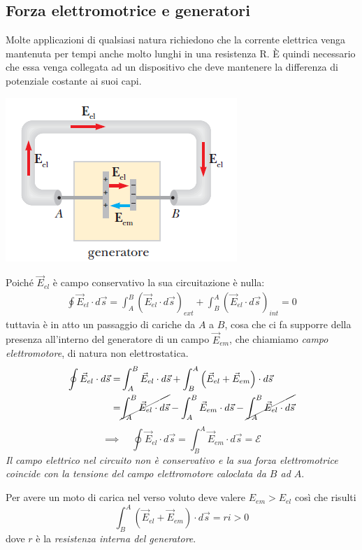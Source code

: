 \documentclass[x11names]{report}
\begin{document}
\subsection{Forza elettromotrice e generatori}
Molte applicazioni di qualsiasi natura richiedono che la corrente elettrica venga mantenuta per tempi anche molto lunghi in una resistenza R. È quindi necessario che essa venga collegata ad un dispositivo che deve mantenere la differenza di potenziale costante ai suoi capi.
\begin{center}
	\includegraphics[scale=0.6]{img/generatore.png}
\end{center}
Poiché \(\vec{E}_{el}\) è campo conservativo la sua circuitazione è nulla:
\begin{align*}
	\oint \vec{E}_{el} \cdot d\vec{s} = \int_A^B\left(\vec{E}_{el} \cdot d\vec{s}\right)_{ext} + \int_B^A\left(\vec{E}_{el} \cdot d\vec{s}\right)_{int} = 0
\end{align*}
tuttavia è in atto un passaggio di cariche da \(A\) a \(B\), cosa che ci fa supporre della presenza all'interno del generatore di un campo \(\vec{E}_{em}\), che chiamiamo \textit{campo elettromotore}, di natura non elettrostatica.
\begin{align*}
	\oint \vec{E}_{el} \cdot d\vec{s} =& \int_A^B\vec{E}_{el} \cdot d\vec{s} + \int_B^A\left(\vec{E}_{el}+ \vec{E}_{em}\right) \cdot d\vec{s} \\
	=& \cancel{\int_A^B\vec{E}_{el} \cdot d\vec{s}} - \int_A^B\vec{E}_{em} \cdot d\vec{s} -\cancel{ \int_A^B\vec{E}_{el} \cdot d\vec{s}}
\end{align*}
\[
\implies \quad \oint \vec{E}_{el} \cdot d\vec{s} = \int_B^A\vec{E}_{em} \cdot d\vec{s} = \mathcal{E} 
\]
\textit{Il campo elettrico nel circuito non è conservativo e la sua forza elettromotrice coincide con la tensione del campo elettromotore caloclata da \(B\) ad \(A\)}.

Per avere un moto di carica nel verso voluto deve valere \(E_{em} > E_{el}\) così che risulti
\[
\int_B^A\left(\vec{E}_{el}+ \vec{E}_{em}\right)\cdot d\vec{s} = ri > 0
\]
dove \(r\) è la \textit{resistenza interna del generatore}.
\end{document}
